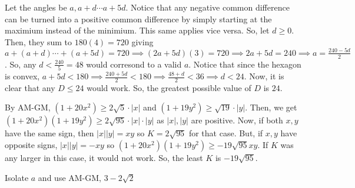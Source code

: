 \documentclass[11pt]{article}
\begin{document}

\begin{sol}
Let the angles be $a,a+d\cdots a+5d$.  Notice that any negative common difference can be turned into a positive common difference by simply starting at the maximium instead of the minimium. This same applies vice versa. So, let $d\ge 0$. Then, they sum to $180(4)=720$ giving $a+(a+d)\cdots + (a+5d)=720\implies (2a+5d)(3)=720\implies 2a+5d=240\implies a =\frac{240-5d}{2}$. So, any $d<\frac{240}{5}=48$ would corresond to a valid $a$. Notice that since the hexagon is convex, $a+5d<180\implies \frac{240+5d}{2} < 180 \implies \frac{48+d}{2} < 36\implies d < 24$. Now, it is clear that any $D\leq 24$ would work. So, the greatest possible value of $D$ is $\boxed{24}$.
\end{sol}


\begin{sol}
By AM-GM, $(1+20x^2)\ge 2\sqrt{5}\cdot |x|$ and $(1+19y^2)\ge \sqrt{19}\cdot |y|$. Then, we get $(1+20x^2)(1+19y^2)\ge 2\sqrt{95} \cdot |x|\cdot |y|$ as $|x|,|y|$ are positive. Now, if both $x,y$ have the same sign, then $|x||y|=xy$ so $K=2\sqrt{95}$ for that case. But, if $x,y$ have opposite signs, $|x||y|=-xy$ so $(1+20x^2)(1+19y^2)\ge -19\sqrt{95}xy$. If $K$ was any larger in this case, it would not work. So, the least $K$ is $\boxed{-19\sqrt{95}}$.
\end{sol}


\begin{sol}
Isolate $a$ and use AM-GM, $\boxed{3-2\sqrt{2}}$
\end{sol}

\end{document}
